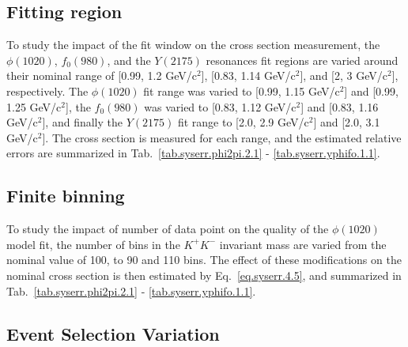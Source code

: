 \subsection{Fitting region}
\label{sec.syserr.range}

To study the impact of the fit window on the cross section measurement, the $\phi(1020)$, $f_{0}(980)$, and the $Y(2175)$  resonances fit regions are varied around their nominal range of [0.99, 1.2 GeV/c$^2$], [0.83, 1.14 GeV/c$^2$], and [2, 3 GeV/c$^2$], respectively. The $\phi(1020)$ fit range was varied to [0.99, 1.15 GeV/c$^2$] and [0.99, 1.25 GeV/c$^2$], the $f_{0}(980)$ was varied to [0.83, 1.12 GeV/c$^2$] and [0.83, 1.16 GeV/c$^2$], and finally the $Y(2175)$ fit range to [2.0, 2.9 GeV/c$^2$] and [2.0, 3.1 GeV/c$^2$]. The cross section is measured for each range, and the estimated relative errors are summarized in Tab.~\ref{tab.syserr.phi2pi.2.1} - \ref{tab.syserr.yphifo.1.1}.

\subsection{Finite binning}
\label{sec.syserr.bin}

To study the impact of number of data point on the quality of the $\phi(1020)$ model fit, the number of bins in the $K^+K^-$ invariant mass are varied from the nominal value of 100, to 90 and 110 bins. The effect of these modifications on the nominal cross section is then estimated by Eq.~\ref{eq.syserr.4.5}, and summarized in Tab.~\ref{tab.syserr.phi2pi.2.1} - \ref{tab.syserr.yphifo.1.1}.

\subsection{Event Selection Variation}
\label{sec.syserr.evt}

